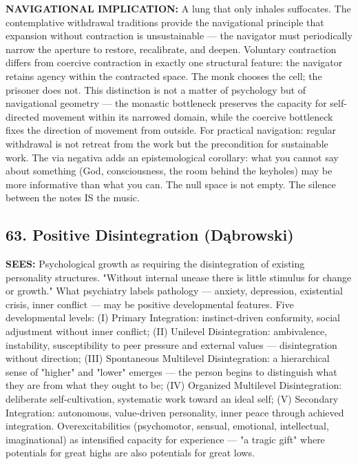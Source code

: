 \textbf{NAVIGATIONAL IMPLICATION:} A lung that only inhales suffocates. The contemplative withdrawal traditions provide the navigational principle that expansion without contraction is unsustainable — the navigator must periodically narrow the aperture to restore, recalibrate, and deepen. Voluntary contraction differs from coercive contraction in exactly one structural feature: the navigator retains agency within the contracted space. The monk chooses the cell; the prisoner does not. This distinction is not a matter of psychology but of navigational geometry — the monastic bottleneck preserves the capacity for self-directed movement within its narrowed domain, while the coercive bottleneck fixes the direction of movement from outside. For practical navigation: regular withdrawal is not retreat from the work but the precondition for sustainable work. The via negativa adds an epistemological corollary: what you cannot say about something (God, consciousness, the room behind the keyholes) may be more informative than what you can. The null space is not empty. The silence between the notes IS the music.


\bigskip\noindent\makebox[\textwidth]{\color{rulegray}\rule{5cm}{0.3pt}}\bigskip


\subsection*{63. Positive Disintegration (Dąbrowski)}


\textbf{SEES:} Psychological growth as requiring the disintegration of existing personality structures. "Without internal unease there is little stimulus for change or growth." What psychiatry labels pathology — anxiety, depression, existential crisis, inner conflict — may be positive developmental features. Five developmental levels: (I) Primary Integration: instinct-driven conformity, social adjustment without inner conflict; (II) Unilevel Disintegration: ambivalence, instability, susceptibility to peer pressure and external values — disintegration without direction; (III) Spontaneous Multilevel Disintegration: a hierarchical sense of "higher" and "lower" emerges — the person begins to distinguish what they are from what they ought to be; (IV) Organized Multilevel Disintegration: deliberate self-cultivation, systematic work toward an ideal self; (V) Secondary Integration: autonomous, value-driven personality, inner peace through achieved integration. Overexcitabilities (psychomotor, sensual, emotional, intellectual, imaginational) as intensified capacity for experience — "a tragic gift" where potentials for great highs are also potentials for great lows.


